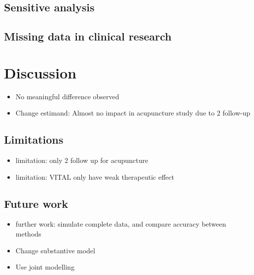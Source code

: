 \documentclass{article}
\providecommand{\tightlist}{%
  \setlength{\itemsep}{0pt}\setlength{\parskip}{0pt}}
\begin{document}
\subsection{Sensitive analysis}\label{sensitive-analysis-1}

\subsection{Missing data in clinical
research}\label{missing-data-in-clinical-research}

\section{Discussion}\label{discussion}

\begin{itemize}
\tightlist
\item
  No meaningful difference observed
\item
  Change estimand: Almost no impact in acupuncture study due to 2
  follow-up
\end{itemize}

\subsection{Limitations}\label{limitations}

\begin{itemize}
\tightlist
\item
  limitation: only 2 follow up for acupuncture
\item
  limitation: VITAL only have weak therapeutic effect
\end{itemize}

\subsection{Future work}\label{future-work}

\begin{itemize}
\tightlist
\item
  further work: simulate complete data, and compare accuracy between
  methods
\item
  Change substantive model
\item
  Use joint modelling
\end{itemize}



\end{document}
